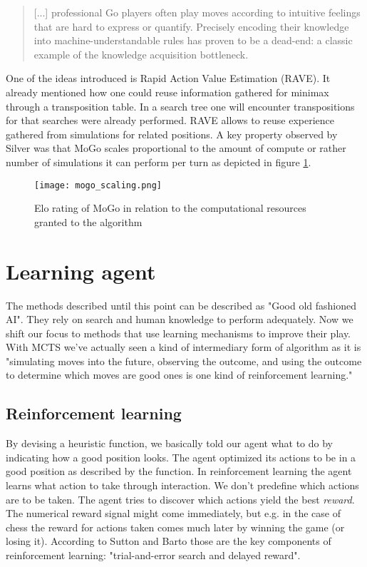\begin{quotation}
    [...] professional Go players often play moves according to intuitive feelings that are hard to express or quantify. Precisely encoding their knowledge into machine-understandable rules has proven to be a dead-end: a classic example of the knowledge acquisition bottleneck. \cite[p. 1873]{gelly_monte-carlo_2011}
\end{quotation}

One of the ideas introduced is Rapid Action Value Estimation (RAVE). It already mentioned how one could reuse information gathered for minimax through a transposition table. In a search tree one will encounter transpositions for that searches were already performed. RAVE allows to reuse experience gathered from simulations for related positions. A key property observed by Silver was that MoGo scales proportional to the amount of compute or rather number of simulations it can perform per turn as depicted in figure \ref{mogo_scaling}.

\begin{figure}
    \centering
    \texttt{[image: mogo\_scaling.png]}
    \caption{Elo rating of MoGo in relation to the computational resources granted to the algorithm \cite[p. 1872]{gelly_monte-carlo_2011}}
    \label{mogo_scaling}
\end{figure}

\section{Learning agent}
The methods described until this point can be described as "Good old fashioned AI". They rely on search and human knowledge to perform adequately. Now we shift our focus to methods that use learning mechanisms to improve their play. With MCTS we've actually seen a kind of intermediary form of algorithm as it is "simulating moves into the future, observing the outcome, and using the outcome to determine which moves are good ones is one kind of reinforcement learning." \cite[p. 331]{russell_artificial_2021}

\subsection{Reinforcement learning}
By devising a heuristic function, we basically told our agent what to do by indicating how a good position looks. The agent optimized its actions to be in a good position as described by the function. In reinforcement learning the agent learns what action to take through interaction. We don't predefine which actions are to be taken. The agent tries to discover which actions yield the best \textit{reward}. The numerical reward signal might come immediately, but e.g. in the case of chess the reward for actions taken comes much later by winning the game (or losing it). According to Sutton and Barto those are the key components of reinforcement learning: "trial-and-error search and delayed reward". \cite[p. 1]{sutton_reinforcement_2018}

